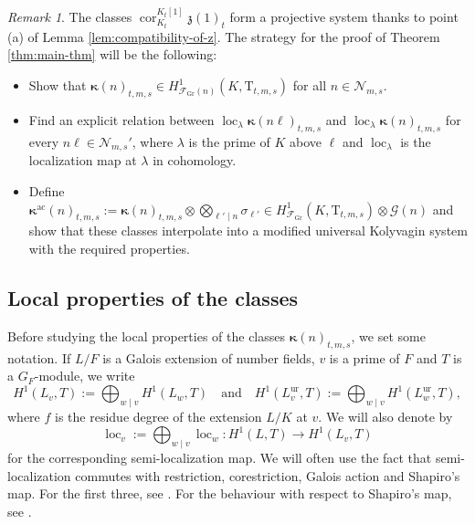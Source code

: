 \documentclass[12pt,reqno]{amsart}
\theoremstyle{definition}
\theoremstyle{remark}
\newtheorem{remark}[theorem]{Remark}
\newcommand{\T}{\boldsymbol{\mathrm{T}}}
\DeclareMathOperator{\Cor}{cor}
\DeclareMathOperator{\loc}{loc}
\newcommand{\ac}{\mathrm{ac}}
\newcommand{\Gr}{\mathrm{Gr}}
\newcommand{\ur}{\mathrm{ur}}
\newcommand{\gk}{\kappa}
\newcommand{\gl}{\lambda}
\newcommand{\gs}{\sigma}
\begin{document}
\begin{remark}
    The classes $\Cor^{K_t[1]}_{K_t}\mathfrak{z}(1)_{t}$ form a projective system thanks to point (a) of Lemma \ref{lem:compatibility-of-z}. The strategy for the proof of Theorem \ref{thm:main-thm} will be the following:
    \begin{itemize}
        \item[(i)] Show that $\boldsymbol{\kappa}(n)_{t,m,s}\in H^1_{\mathcal{F}_{\Gr}(n)}(K,\T_{t,m,s})$ for all $n\in\mathcal{N}_{m,s}$.
        \item[(ii)] Find an explicit relation between $\loc_\gl \boldsymbol{\kappa}(n\ell)_{t,m,s}$ and $\loc_\gl  \boldsymbol{\kappa}(n)_{t,m,s}$ for every $n\ell\in\mathcal{N}_{m,s}'$, where $\gl$ is the prime of $K$ above $\ell$ and $\loc_\gl$ is the localization map at $\gl$ in cohomology.
        \item[(iii)] Define $\boldsymbol{\gk}^{\ac}(n)_{t,m,s}:=\boldsymbol{\gk}(n)_{t,m,s}\otimes\bigotimes_{\ell'\mid n}\gs_{\ell'}\in H^1_{\mathcal{F}_{\Gr}}(K,\T_{t,m,s})\otimes\mathcal{G}(n)$ and show that these classes interpolate into a modified universal Kolyvagin system with the required properties.
    \end{itemize}
\end{remark}






\subsection{Local properties of the classes}

Before studying the local properties of the classes $\boldsymbol{\kappa}(n)_{t,m,s}$, we set some notation. If $L/F$ is a Galois extension of number fields, $v$ is a prime of $F$ and $T$ is a $G_F$-module, we write
\begin{equation*}
    H^1(L_v,T):=\bigoplus_{w\mid v} H^1(L_w,T)\quad\text{and}\quad H^1(L_v^{\ur}, T):=\bigoplus_{w\mid v} H^1(L_w^{\ur},T),
\end{equation*}
where $f$ is the residue degree of the extension $L/K$ at $v$. We will also denote by
\begin{equation*}
    \loc_v:=\bigoplus_{w\mid v}\loc_w\colon H^1(L,T)\to H^1(L_v,T)
\end{equation*}
for the corresponding semi-localization map. We will often use the fact that semi-localization commutes with restriction, corestriction, Galois action and Shapiro's map. For the first three, see \cite[§1.5]{Neukirch-Schmidt-Wingberg:cohomology-of-number-fields}. For the behaviour with respect to Shapiro's map, see \cite[§3.1.2]{Skinner-Urban:Iwasawa.main-conjecture-for-GL2}.
\end{document}
